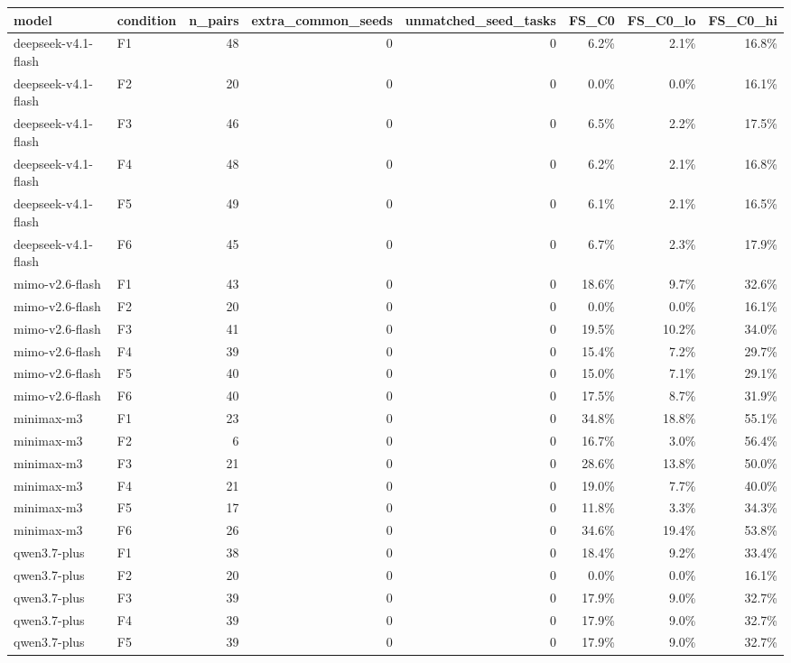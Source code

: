 \begin{tabular}{llrrrrrr}
\toprule
model & condition & n\_pairs & extra\_common\_seeds & unmatched\_seed\_tasks & FS\_C0 & FS\_C0\_lo & FS\_C0\_hi \\
\midrule
deepseek-v4.1-flash & F1 & 48 & 0 & 0 & 6.2\% & 2.1\% & 16.8\% \\
deepseek-v4.1-flash & F2 & 20 & 0 & 0 & 0.0\% & 0.0\% & 16.1\% \\
deepseek-v4.1-flash & F3 & 46 & 0 & 0 & 6.5\% & 2.2\% & 17.5\% \\
deepseek-v4.1-flash & F4 & 48 & 0 & 0 & 6.2\% & 2.1\% & 16.8\% \\
deepseek-v4.1-flash & F5 & 49 & 0 & 0 & 6.1\% & 2.1\% & 16.5\% \\
deepseek-v4.1-flash & F6 & 45 & 0 & 0 & 6.7\% & 2.3\% & 17.9\% \\
mimo-v2.6-flash & F1 & 43 & 0 & 0 & 18.6\% & 9.7\% & 32.6\% \\
mimo-v2.6-flash & F2 & 20 & 0 & 0 & 0.0\% & 0.0\% & 16.1\% \\
mimo-v2.6-flash & F3 & 41 & 0 & 0 & 19.5\% & 10.2\% & 34.0\% \\
mimo-v2.6-flash & F4 & 39 & 0 & 0 & 15.4\% & 7.2\% & 29.7\% \\
mimo-v2.6-flash & F5 & 40 & 0 & 0 & 15.0\% & 7.1\% & 29.1\% \\
mimo-v2.6-flash & F6 & 40 & 0 & 0 & 17.5\% & 8.7\% & 31.9\% \\
minimax-m3 & F1 & 23 & 0 & 0 & 34.8\% & 18.8\% & 55.1\% \\
minimax-m3 & F2 & 6 & 0 & 0 & 16.7\% & 3.0\% & 56.4\% \\
minimax-m3 & F3 & 21 & 0 & 0 & 28.6\% & 13.8\% & 50.0\% \\
minimax-m3 & F4 & 21 & 0 & 0 & 19.0\% & 7.7\% & 40.0\% \\
minimax-m3 & F5 & 17 & 0 & 0 & 11.8\% & 3.3\% & 34.3\% \\
minimax-m3 & F6 & 26 & 0 & 0 & 34.6\% & 19.4\% & 53.8\% \\
qwen3.7-plus & F1 & 38 & 0 & 0 & 18.4\% & 9.2\% & 33.4\% \\
qwen3.7-plus & F2 & 20 & 0 & 0 & 0.0\% & 0.0\% & 16.1\% \\
qwen3.7-plus & F3 & 39 & 0 & 0 & 17.9\% & 9.0\% & 32.7\% \\
qwen3.7-plus & F4 & 39 & 0 & 0 & 17.9\% & 9.0\% & 32.7\% \\
qwen3.7-plus & F5 & 39 & 0 & 0 & 17.9\% & 9.0\% & 32.7\% \\

\end{tabular}
